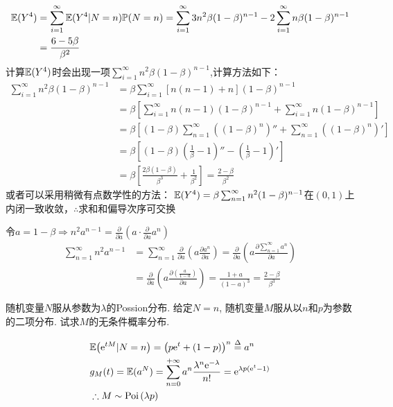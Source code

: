 \begin{solution}[2]
\[\begin{aligned}
			\mathbb{E}(Y^4)     & = \sum_{i=1}^{\infty}\mathbb{E}(Y^4|N=n)\mathbb{P}(N=n) = \sum_{i=1}^{\infty}3n^2\beta (1-\beta )^{n-1} - 2\sum_{i=1}^{\infty}n\beta (1-\beta )^{n-1}                                   \\
			            & = \frac{6-5\beta}{{\beta}^2}
		\end{aligned}\]
	计算$\mathbb{E}(Y^4)$时会出现一项$\sum_{i=1}^{\infty}n^2\beta (1-\beta )^{n-1}$,计算方法如下：
	\[\begin{aligned}
			\sum_{i=1}^{\infty}n^2\beta (1-\beta )^{n-1} & = \beta \sum_{i=1}^{\infty}[n(n-1)+n](1-\beta )^{n-1}                                                                        \\
			                                             & = \beta \left[\sum_{i=1}^{\infty}n(n-1)(1-\beta )^{n-1} + \sum_{i=1}^{\infty}n(1-\beta)^{n-1}\right]                         \\
			                                             & = \beta \left[(1-\beta )\sum_{n=1}^{\infty}\left((1-\beta )^n\right)'' + \sum_{n=1}^{\infty}\left((1-\beta)^n\right)'\right] \\
			                                             & = \beta \left[(1-\beta)\left(\frac{1}{\beta}-1\right)'' - \left(\frac{1}{\beta} - 1\right)'\right]                           \\
			                                             & = \beta \left[\frac{2\beta(1-\beta)}{\beta ^3} + \frac{1}{\beta ^2}\right] = \frac{2-\beta}{\beta ^2}
		\end{aligned}\]
	或者可以采用稍微有点数学性的方法：
	$\mathbb{E}(Y^4) = \beta \sum_{n=1}^{\infty}n^2 (1-\beta)^{n-1}$在$(0,1)$上内闭一致收敛，$\therefore$求和和偏导次序可交换

	令$a = 1-\beta \Rightarrow n^2 a^{n-1}=\frac{\partial }{\partial a}(a\cdot \frac{\partial }{\partial a}a^n)$
	\[\begin{aligned}
			\sum_{n=1}^{\infty}n^2 a^{n-1} & = \sum_{n=1}^{\infty}\frac{\partial }{\partial a}\left(a \frac{\partial a^n}{\partial a}\right) = \frac{\partial }{\partial a}\left(a \frac{\partial \sum_{n=1}^{\infty}a^n}{\partial a}\right) \\
			                               & = \frac{\partial }{\partial a}\left(a \frac{\partial (\frac{a}{1-a})}{\partial a}\right) = \frac{1+a}{(1-a)^3} = \frac{2-\beta}{\beta ^3}
		\end{aligned}\]
\end{solution}

\begin{problem}{1.17}
随机变量$N$服从参数为$\lambda$的Possion分布. 给定$N=n$, 随机变量$M$服从以$n$和$p$为参数的二项分布. 试求$M$的无条件概率分布.
\end{problem}
\begin{solution}
	\[
		\begin{split}
			& \mathbb{E}\big(\mathrm{e}^{tM}|N=n\big) = \big(p\mathrm{e}^t+(1-p)\big)^n \overset{\Delta}{=} a^n\\
			& g_M(t) = \mathbb{E}(a^N) = \sum^{+\infty}_{n=0}a^n\frac{\lambda^n \mathrm{e}^{-\lambda}}{n!} = \mathrm{e}^{\lambda p(\mathrm{e}^t-1)}\\
			& \therefore M \sim \text{Poi}\,(\lambda p)
		\end{split}
	\]
\end{solution}
